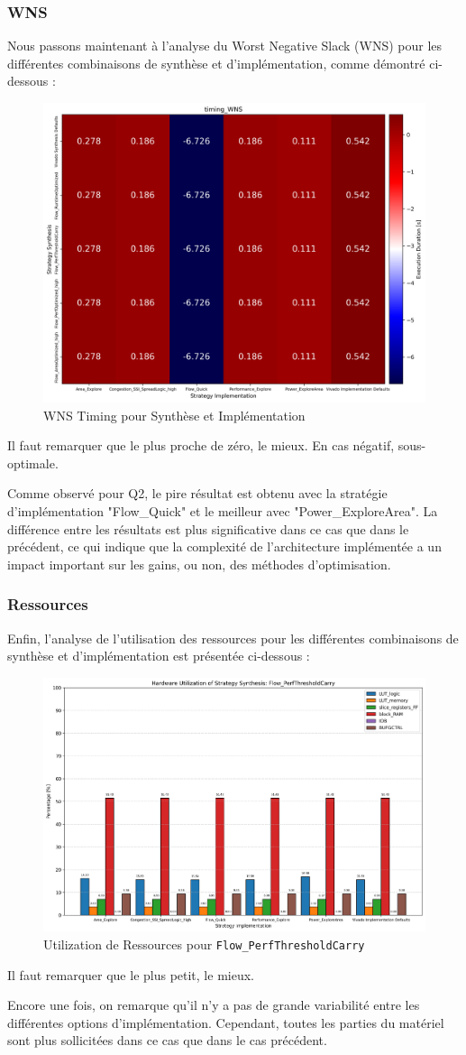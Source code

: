 \documentclass[../CSC_5RO07_TA.tex]{subfiles}
\begin{document}
\subsubsection{WNS}
\noindent Nous passons maintenant à l'analyse du Worst Negative Slack (WNS) pour les différentes combinaisons de synthèse et d'implémentation, comme démontré ci-dessous :
\begin{figure}[H]
	\centering
	\includegraphics[width=0.5\linewidth]{images/3_timing_WNS.png}
	\caption{WNS Timing pour Synthèse et Implémentation}
	\label{fig:wns_3}
\end{figure}
\begin{remark}
    Il faut remarquer que le plus proche de zéro, le mieux. En cas négatif, sous-optimale.
\end{remark}
\noindent Comme observé pour Q2, le pire résultat est obtenu avec la stratégie d'implémentation "Flow\_Quick" et le meilleur avec "Power\_ExploreArea". La différence entre les résultats est plus significative dans ce cas que dans le précédent, ce qui indique que la complexité de l'architecture implémentée a un impact important sur les gains, ou non, des méthodes d'optimisation.


\subsubsection{Ressources}
\noindent Enfin, l'analyse de l'utilisation des ressources pour les différentes combinaisons de synthèse et d'implémentation est présentée ci-dessous :
\begin{figure}[H]
	\centering
	\includegraphics[width=0.5\linewidth]{images/3_utilization_Flow_PerfThresholdCarry.png}
	\caption{Utilization de Ressources pour \texttt{Flow\_PerfThresholdCarry}}
	\label{fig:ressouces_3}
\end{figure}
\begin{remark}
    Il faut remarquer que le plus petit, le mieux.
\end{remark}
\noindent Encore une fois, on remarque qu'il n'y a pas de grande variabilité entre les différentes options d'implémentation. Cependant, toutes les parties du matériel sont plus sollicitées dans ce cas que dans le cas précédent.
\end{document}
